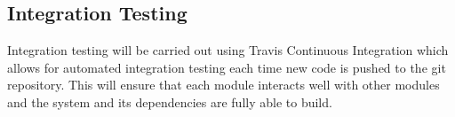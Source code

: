 \documentclass{article}
\begin{document}
\subsection{Integration Testing}
Integration testing will be carried out using Travis Continuous Integration which allows for automated integration testing each time new code is pushed to the git repository. This will ensure that each module interacts well with other modules and the system and its dependencies are fully able to build. 
\end{document}
